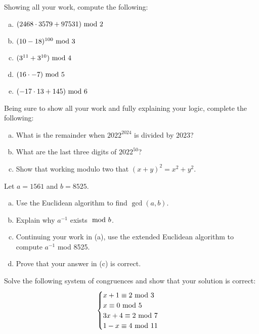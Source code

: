 \documentclass[12pt,letterpaper]{exam}
\begin{document}
\begin{questions}
\newpage
\question[10] Showing all your work, compute the following:
	\begin{enumerate}[(a)]
	\item $(2468 \cdot 3579 + 97531) \text{ mod } 2$
	\item $(10 - 18)^{100} \text{ mod } 3$
	\item $(3^{11} + 3^{10}) \text{ mod } 4$
	\item $(16 \cdot -7) \text{ mod } 5$
	\item $(-17 \cdot 13 + 145) \text{ mod } 6$
	\end{enumerate}



\newpage
\question[10] Being sure to show all your work and fully explaining your logic, complete the following:
	\begin{enumerate}[(a)]
	\item What is the remainder when $2022^{2024}$ is divided by $2023$?
	\item What are the last three digits of $2022^{50}$?
	\item Show that working modulo two that $(x + y)^2= x^2 + y^2$. 
	\end{enumerate}



\newpage
\question[10] Let $a= 1561$ and $b= 8525$.
	\begin{enumerate}[(a)]
	\item Use the Euclidean algorithm to find $\gcd(a, b)$. 
	\item Explain why $a^{-1}$ exists $\text{ mod } b$.
	\item Continuing your work in (a), use the extended Euclidean algorithm to compute $a^{-1}$ mod 8525.
	\item Prove that your answer in (c) is correct. 
	\end{enumerate}



\newpage
\question[10] Solve the following system of congruences and show that your solution is correct:
	\[
	\begin{cases}
	x + 1 \equiv 2 \text{ mod } 3 \\
	x \equiv 0 \text{ mod } 5 \\
	3x + 4 \equiv 2 \text{ mod } 7 \\
	1 - x \equiv 4 \text{ mod } 11
	\end{cases}
	\]


\end{questions}
\end{document}
